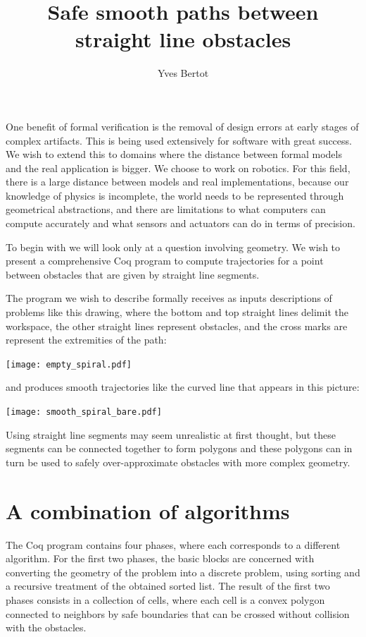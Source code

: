 \documentclass{easychair}
\title{Safe smooth paths between straight line obstacles}
\author{Yves Bertot}
\institute{Inria Université Côte d'Azur}
\begin{document}
\maketitle

One benefit of formal verification is the removal of design errors at early
stages of complex artifacts.  This is being used extensively for software
with great success.  We wish to
extend this to domains where the distance between formal models and the
real application is bigger.  We choose to work on robotics.  For this
field, there is a large distance between models and real implementations,
because our knowledge of physics is incomplete,
the world needs to be represented through geometrical abstractions, and
there are limitations to what computers can compute accurately and what
sensors and actuators can do in terms of precision.

To begin with
we will look only at a question involving geometry.  
We wish to present a comprehensive Coq program
to compute trajectories for a point between obstacles that are given by straight
line segments.

The program we wish to describe formally receives as inputs descriptions of problems like this drawing, where the bottom and top straight lines delimit the workspace, the other straight lines represent obstacles, and the cross marks are represent the extremities of the path:
\begin{center}
\texttt{[image: empty\_spiral.pdf]}
\end{center}
and produces smooth trajectories like the curved line that appears in this
picture:
\begin{center}
\texttt{[image: smooth\_spiral\_bare.pdf]}
\end{center}
Using straight line segments may seem unrealistic at first thought, but
these segments can be connected together to form polygons and
these polygons can in turn be used to safely over-approximate
obstacles with more
complex geometry.

\section{A combination of algorithms}
The Coq program contains four phases, where each corresponds to a different
algorithm.  For the first two phases, the basic blocks are concerned with
converting the geometry of the problem into a discrete problem, using sorting
and a recursive treatment of the obtained sorted list.  The result of the
first two phases consists in a collection of cells, where each cell is
a convex polygon connected to neighbors by safe boundaries that can
be crossed without collision with the obstacles.
\end{document}
